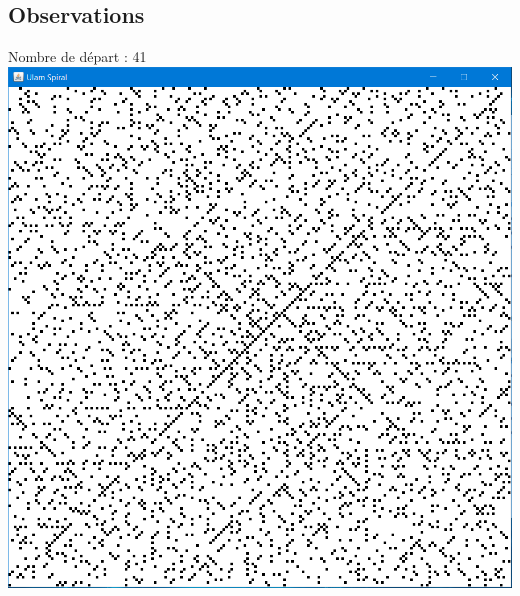\documentclass{beamer}
\begin{document}
\subsection{Observations}
\begin{frame}
\begin{center}
Nombre de départ : 41\\
\vspace{0.1cm}
\includegraphics[scale=0.3]{images/spirale_41.PNG}
\end{center}
\end{frame}
\end{document}
